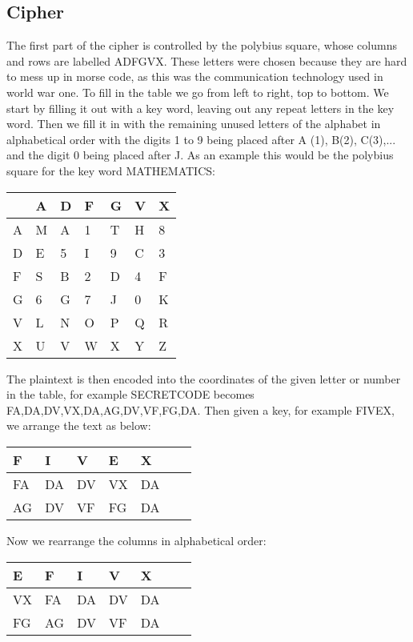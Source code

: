 \documentclass{article}
\begin{document}
\subsection*{Cipher}
The first part of the cipher is controlled by the polybius square, whose columns and rows are labelled ADFGVX. These letters were chosen because they are hard to mess up in morse code, as this was the communication technology used in world war one. To fill in the table we go from left to right, top to bottom. We start by filling it out with a key word, leaving out any repeat letters in the key word. Then we fill it in with the remaining unused letters of the alphabet in alphabetical order with the digits 1 to 9 being placed after A (1), B(2), C(3),... and the digit 0 being placed after J. As an example this would be the polybius square for the key word MATHEMATICS:
\newline
\begin{center}
\begin{tabular}{ | m{1cm} | m{1cm}| m{1cm} | m{1cm} | m{1cm} | m{1cm} | m{1cm} |} 
 \hline
& A & D & F & G & V & X \\
 \hline
A & M & A & 1 & T & H & 8 \\
 \hline
D & E & 5 & I & 9 & C & 3 \\
 \hline
F & S & B & 2 & D & 4 & F \\
 \hline
G & 6 & G & 7 & J & 0 & K \\
 \hline
V & L & N & O & P & Q & R \\
 \hline
X & U & V & W & X & Y & Z \\
 \hline
\end{tabular}
\end{center}
The plaintext is then encoded into the coordinates of the given letter or number in the table, for example SECRETCODE becomes FA,DA,DV,VX,DA,AG,DV,VF,FG,DA. Then given a key, for example FIVEX, we arrange the text as below:
\begin{center}
\begin{tabular}{ | m{1cm} | m{1cm}| m{1cm} | m{1cm} | m{1cm} | m{1cm} | m{1cm} |} 
 \hline
F & I & V & E & X\\
 \hline
FA & DA & DV & VX & DA\\
 \hline
AG & DV & VF & FG & DA\\
 \hline
\end{tabular}
\end{center}
Now we rearrange the columns in alphabetical order:
\begin{center}
\begin{tabular}{ | m{1cm} | m{1cm}| m{1cm} | m{1cm} | m{1cm} | m{1cm} | m{1cm} |} 
 \hline
E & F & I & V & X\\
 \hline
VX & FA & DA & DV & DA\\
 \hline
FG & AG & DV & VF & DA\\
 \hline
\end{tabular}
\end{center}
\end{document}
